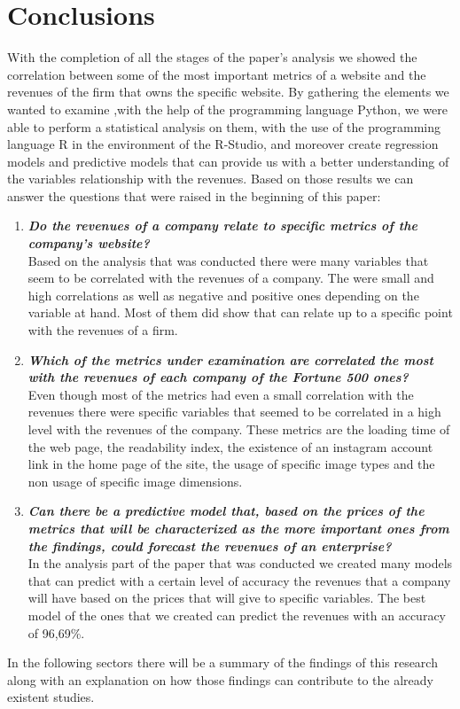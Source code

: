 \documentclass{article}
\begin{document}
\section{Conclusions}
With the completion of all the stages of the paper's analysis we showed the correlation between some of the most important metrics of a website and the revenues of the firm that owns the specific website. By gathering the elements we wanted to examine ,with the help of the programming language Python, we were able to perform a statistical analysis on them, with the use of the programming language R in the environment of the R-Studio, and moreover create regression models and predictive models that can provide us with a better understanding of the variables relationship with the revenues. Based on those results we can answer the questions that were raised in the beginning of this paper:
\begin{enumerate}
\item \textbf{\textit{Do the revenues of a company relate to specific metrics of the company's website?}}\\
Based on the analysis that was conducted there were many variables that seem to be correlated with the revenues of a company. The were small and high correlations as well as negative and positive ones depending on the variable at hand. Most of them did show that can relate up to a specific point with the revenues of a firm.
\item \textbf{\textit{Which of the metrics under examination are correlated the most with the revenues of each company of the Fortune 500 ones?}}\\
Even though most of the metrics had even a small correlation with the revenues there were specific variables that seemed to be correlated in a high level with the revenues of the company. These metrics are the loading time of the web page, the readability index, the existence of an instagram account link in the home page of the site, the usage of specific image types and the non usage of specific image dimensions.
\item \textbf{\textit{Can there be a predictive model that, based on the prices of the metrics that will be characterized as the more important ones from the findings, could forecast the revenues of an enterprise?}}\\
In the analysis part of the paper that was conducted we created many models that can predict with a certain level of accuracy the revenues that a company will have based on the prices that will give to specific variables. The best model of the ones that we created can predict the revenues with an accuracy of 96,69\%.
\end{enumerate}
In the following sectors there will be a summary of the findings of this research along with an explanation on how those findings can contribute to the already existent studies.
\end{document}
